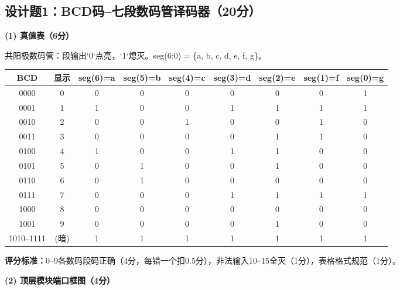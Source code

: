 \subsection{设计题1：BCD码--七段数码管译码器（20分）}

\textbf{(1) 真值表（6分）}

共阳极数码管：段输出`0`点亮，`1`熄灭。seg(6:0) = \{a, b, c, d, e, f, g\}。

\begin{center}
\begin{tabular}{|c|c|c|c|c|c|c|c|c|}
\hline
\textbf{BCD} & \textbf{显示} & \textbf{seg(6)=a} & \textbf{seg(5)=b} & \textbf{seg(4)=c} & \textbf{seg(3)=d} & \textbf{seg(2)=e} & \textbf{seg(1)=f} & \textbf{seg(0)=g} \\
\hline
0000 & 0 & 0 & 0 & 0 & 0 & 0 & 0 & 1 \\
0001 & 1 & 1 & 0 & 0 & 1 & 1 & 1 & 1 \\
0010 & 2 & 0 & 0 & 1 & 0 & 0 & 1 & 0 \\
0011 & 3 & 0 & 0 & 0 & 0 & 1 & 1 & 0 \\
0100 & 4 & 1 & 0 & 0 & 1 & 1 & 0 & 0 \\
0101 & 5 & 0 & 1 & 0 & 0 & 1 & 0 & 0 \\
0110 & 6 & 0 & 1 & 0 & 0 & 0 & 0 & 0 \\
0111 & 7 & 0 & 0 & 0 & 1 & 1 & 1 & 1 \\
1000 & 8 & 0 & 0 & 0 & 0 & 0 & 0 & 0 \\
1001 & 9 & 0 & 0 & 0 & 0 & 1 & 0 & 0 \\
\hline
1010--1111 & (暗) & 1 & 1 & 1 & 1 & 1 & 1 & 1 \\
\hline
\end{tabular}
\end{center}

\textbf{评分标准：}0--9各数码段码正确（4分，每错一个扣0.5分），非法输入10--15全灭（1分），表格格式规范（1分）。

\vspace{0.3cm}

\textbf{(2) 顶层模块端口框图（4分）}

